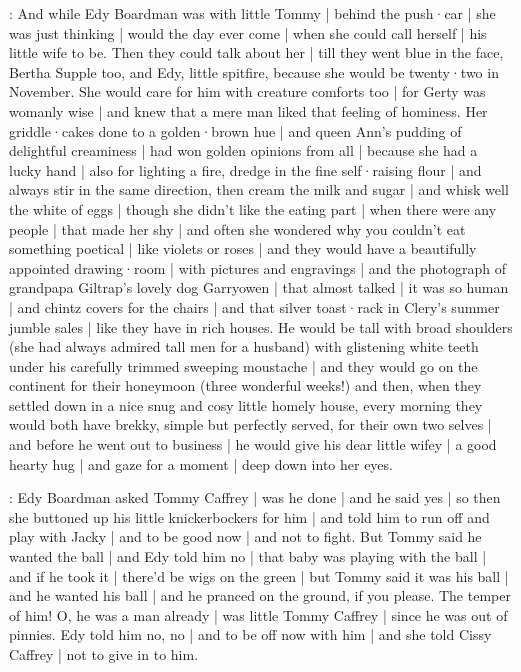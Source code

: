 :
And while Edy Boardman was with little Tommy |
behind the push·car |
she was just thinking |
would the day ever come |
when she could call herself |
his little wife to be.%
Then they could talk about her |
till they went blue in the face,
Bertha Supple too,
and Edy,
little spitfire,
because she would be twenty·two in November.
She would care for him with creature comforts too |
for Gerty was womanly wise |
and knew that a mere man liked that feeling of hominess.
Her griddle·cakes done to a golden·brown hue |
and queen Ann's pudding of delightful creaminess |
had won golden opinions from all |
because she had a lucky hand |
also for lighting a fire,
dredge in the fine self·raising flour |
and always stir in the same direction,
then cream the milk and sugar |
and whisk well the white of eggs |
though she didn't like the eating part |
when there were any people |
that made her shy |
and often
she wondered why you couldn't eat something poetical |
like violets or roses |
and they would have a beautifully appointed drawing·room |
with pictures and engravings |
and the photograph of grandpapa Giltrap's lovely dog Garryowen |
that almost talked |
it was so human |
and chintz covers for the chairs |
and that silver toast·rack in Clery's summer jumble sales |
like they have in rich houses.
He would be tall with broad shoulders
(she had always admired tall men for a husband)
with glistening white teeth
under his carefully trimmed sweeping moustache |
and they would go on the continent
for their honeymoon
(three wonderful weeks!)
and then,
when they settled down in a nice snug and cosy little homely house,
every morning they would both have brekky,%
simple but perfectly served,
for their own two selves |
and before he went out to business |
he would give his dear little wifey |
a good hearty hug |
and gaze for a moment |
deep down into her eyes.

:
Edy Boardman asked Tommy Caffrey |
was he done |
and he said yes |
so then she buttoned up his little knickerbockers for him |
and told him to run off
and play with Jacky |
and to be good now |
and not to fight.
But Tommy said he wanted the ball |
and Edy told him no |
that baby was playing with the ball |
and if he took it |
there'd be wigs on the green |
but Tommy said it was his ball |
and he wanted his ball |
and he pranced on the ground,
if you please.
The temper of him!
O, he was a man already |
was little Tommy Caffrey |
since he was out of pinnies.%
Edy told him no, no |
and to be off now with him |
and she told Cissy Caffrey |
not to give in to him.

